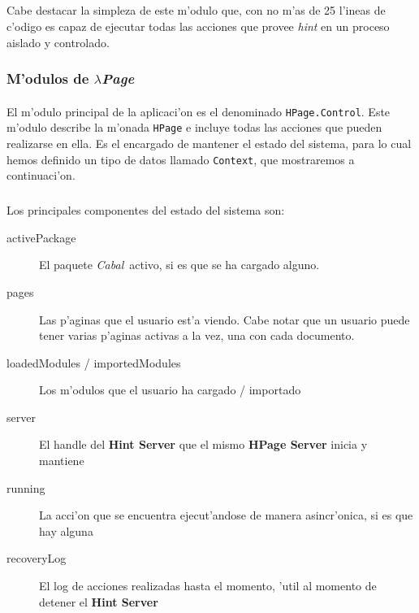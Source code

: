\documentclass[a4paper]{article}
\newcommand{\hpage}{\textbf{\textsl{$\lambda$Page}}}
\newcommand{\cabal}{\textsl{Cabal}}
\begin{document}
\subparagraph{}Cabe destacar la simpleza de este m'odulo que, con no m'as de 25 l'ineas de c'odigo es capaz de ejecutar todas las acciones que provee \textsl{hint} en un proceso aislado y controlado.

\subsubsection{M'odulos de \hpage}
\paragraph{}El m'odulo principal de la aplicaci'on es el denominado \texttt{HPage.Control}.  Este m'odulo describe la m'onada \texttt{HPage} e incluye todas las acciones que pueden realizarse en ella.  Es el encargado de mantener el estado del sistema, para lo cual hemos definido un tipo de datos llamado \texttt{Context}, que mostraremos a continuaci'on.
\subparagraph{} Los principales componentes del estado del sistema son:
\begin{description}
	\item[activePackage] El paquete \cabal\ activo, si es que se ha cargado alguno.
	\item[pages] Las p'aginas que el usuario est'a viendo.  Cabe notar que un usuario puede tener varias p'aginas activas a la vez, una con cada documento.
	\item[loadedModules / importedModules] Los m'odulos que el usuario ha cargado / importado
	\item[server] El handle del \textbf{Hint Server} que el mismo \textbf{HPage Server} inicia y mantiene
	\item[running] La acci'on que se encuentra ejecut'andose de manera asincr'onica, si es que hay alguna
	\item[recoveryLog] El log de acciones realizadas hasta el momento, 'util al momento de detener el \textbf{Hint Server}
\end{description}
\end{document}
